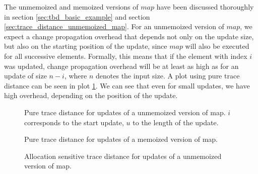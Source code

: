 The unmemoized and memoized versions of $map$ have been discussed thoroughly in section \ref{sec:tbd_basic_example} and section \ref{sec:trace_distance_unmemoized_map}. For an unmemoized version of $map$, we expect a change propagation overhead that depends not only on the update size, but also on the starting position of the update, since $map$ will also be executed for all successive elements. Formally, this means that if the element with index $i$ was updated, change propagation overhead will be at least as high as for an update of size $n-i$, where $n$ denotes the input size. A plot using pure trace distance can be seen in plot \ref{plot:unmemoized_map_pure}. We can see that even for small updates, we have high overhead, depending on the position of the update. 

\begin{figure}
\centering
{}
\caption{Pure trace distance for updates of a unmemoized version of map. $i$ corresponds to the start update, $u$ to the length of the update.}
\label{plot:unmemoized_map_pure}
\end{figure}


\begin{figure}
\centering
{}
\caption{Pure trace distance for updates of a memoized version of map.}
\label{plot:memoized_map_pure}
\end{figure}


\begin{figure}
\centering
{}
\caption{Allocation sensitive trace distance for updates of a unmemoized version of map.}
\label{plot:unmemoized_map_alloc}
\end{figure}

